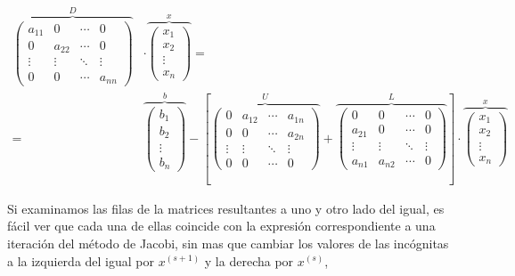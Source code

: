 \begin{align*}
\overbrace{\begin{pmatrix}
a_{11}& 0& \cdots & 0\\
0& a_{22}& \cdots & 0\\
\vdots & \vdots & \ddots & \vdots\\
0& 0& \cdots & a_{nn}
\end{pmatrix}}^D &\cdot \overbrace{\begin{pmatrix}
x_1\\
x_2\\
\vdots \\
x_n
\end{pmatrix}}^x=&\\
=&\overbrace{\begin{pmatrix}
b_1\\
b_2\\
\vdots \\
b_n
\end{pmatrix}}^b-\left[
\overbrace{\begin{pmatrix}
0& a_{12}& \cdots & a_{1n}\\
0& 0& \cdots & a_{2n}\\
\vdots & \vdots & \ddots & \vdots\\
0& 0& \cdots & 0
\end{pmatrix}}^U+
\overbrace{\begin{pmatrix}
0& 0& \cdots & 0\\
a_{21}& 0& \cdots & 0\\
\vdots & \vdots & \ddots & \vdots\\
a_{n1}& a_{n2}& \cdots & 0
\end{pmatrix}}^L \right] \cdot \overbrace{\begin{pmatrix}
x_1\\
x_2\\
\vdots \\
x_n
\end{pmatrix}}^x
\end{align*}

Si examinamos las filas de la matrices resultantes a uno y otro lado del igual, es fácil ver que cada una de ellas coincide con la expresión correspondiente a una iteración del método de Jacobi, sin mas que cambiar los valores de las incógnitas a la izquierda del igual por $x^{(s+1)}$ y la derecha por $x^{(s)}$,

